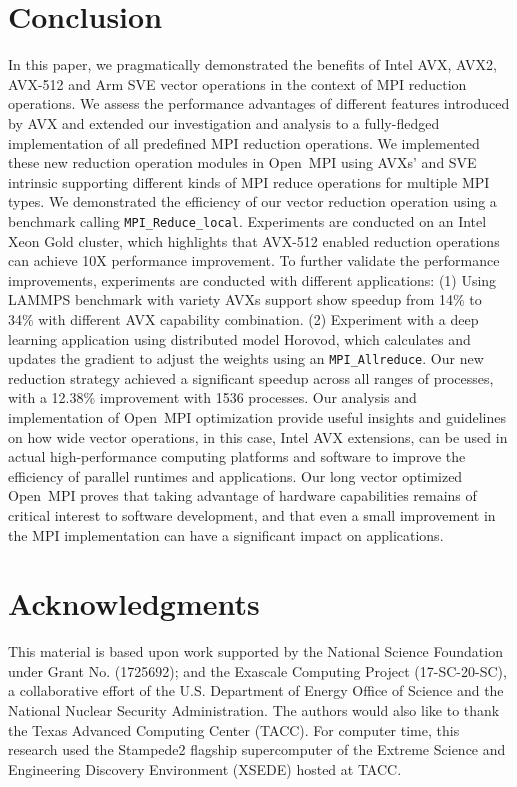 \documentclass[5p,times,twocolumn]{elsarticle}
\newcommand{\mpifunc}[1]{\lstinline"MPI_#1"\xspace}
\newcommand{\ompi}[0]{Open~MPI\xspace}
\newcommand{\mpi}[0]{\textsc{MPI}\xspace}
\begin{document}
\section{Conclusion}\label{sec:conclusion}
In this paper, we pragmatically demonstrated the benefits of Intel
AVX, AVX2, AVX-512 and Arm SVE vector operations in the context of MPI reduction
operations. We assess the performance advantages of different features
introduced by AVX and extended our investigation and analysis to a
fully-fledged implementation of all predefined MPI reduction
operations.
%
We implemented these new reduction operation modules in \ompi using AVXs'
and SVE intrinsic supporting different kinds of \mpi reduce operations for
multiple \mpi types. We demonstrated the efficiency of our vector
reduction operation using a benchmark calling
\mpifunc{Reduce_local}. Experiments are conducted on an Intel Xeon
Gold cluster, which highlights that AVX-512 enabled reduction operations can
achieve 10X performance improvement.
%
To further validate the performance improvements, experiments are
conducted with different applications: (1) Using LAMMPS benchmark with variety AVXs
support show speedup from 14\% to 34\% with different AVX capability combination.
(2) Experiment with a deep learning application
using distributed model Horovod, which calculates and updates the
gradient to adjust the weights using an \mpifunc{Allreduce}.  Our new
reduction strategy achieved a significant speedup across all ranges of
processes, with a 12.38\% improvement with 1536 processes.  Our
analysis and implementation of \ompi optimization provide useful
insights and guidelines on how wide vector operations, in this case,
Intel AVX extensions, can be used in actual high-performance computing
platforms and software to improve the efficiency of parallel runtimes
and applications.
%
Our long vector optimized \ompi proves that taking advantage of hardware
capabilities remains of critical interest to software development, and
that even a small improvement in the MPI implementation can have
a significant impact on applications.

\section*{Acknowledgments}
%
This material is based upon work supported by the National Science Foundation under Grant No. (1725692); and the Exascale Computing Project (17-SC-20-SC), a collaborative effort of the
U.S. Department of Energy Office of Science and the National Nuclear Security Administration.
The authors would also like to thank the
Texas Advanced Computing Center (TACC). For computer time, this research used
the Stampede2 flagship supercomputer of the Extreme Science and Engineering Discovery Environment (XSEDE) hosted at TACC.

\balance

%
%


\end{document}

